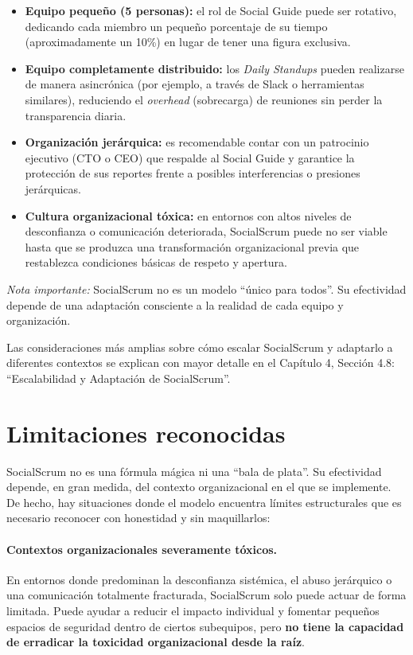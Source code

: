 \begin{itemize}
    \item \textbf{Equipo pequeño (5 personas):} el rol de Social Guide puede ser rotativo, dedicando cada miembro un pequeño porcentaje de su tiempo (aproximadamente un 10\%) en lugar de tener una figura exclusiva.
    \item \textbf{Equipo completamente distribuido:} los \textit{Daily Standups} pueden realizarse de manera asincrónica (por ejemplo, a través de Slack o herramientas similares), reduciendo el \textit{overhead} (sobrecarga) de reuniones sin perder la transparencia diaria.
    \item \textbf{Organización jerárquica:} es recomendable contar con un patrocinio ejecutivo (CTO o CEO) que respalde al Social Guide y garantice la protección de sus reportes frente a posibles interferencias o presiones jerárquicas.
    \item \textbf{Cultura organizacional tóxica:} en entornos con altos niveles de desconfianza o comunicación deteriorada, SocialScrum puede no ser viable hasta que se produzca una transformación organizacional previa que restablezca condiciones básicas de respeto y apertura.
\end{itemize}

\emph{Nota importante:} SocialScrum no es un modelo ``único para todos''.
Su efectividad depende de una adaptación consciente a la realidad de cada equipo y organización.

Las consideraciones más amplias sobre cómo escalar SocialScrum y adaptarlo a diferentes contextos se explican con mayor detalle en el Capítulo 4, Sección 4.8: ``Escalabilidad y Adaptación de SocialScrum''.

\section{Limitaciones reconocidas}

SocialScrum no es una fórmula mágica ni una ``bala de plata''.
Su efectividad depende, en gran medida, del contexto organizacional en el que se implemente. De hecho, hay situaciones donde el modelo encuentra límites estructurales que es necesario reconocer con honestidad y sin maquillarlos:

\paragraph{Contextos organizacionales severamente tóxicos.}
En entornos donde predominan la desconfianza sistémica, el abuso jerárquico o una comunicación totalmente fracturada, SocialScrum solo puede actuar de forma limitada. Puede ayudar a reducir el impacto individual y fomentar pequeños espacios de seguridad dentro de ciertos subequipos, pero \textbf{no tiene la capacidad de erradicar la toxicidad organizacional desde la raíz}.

